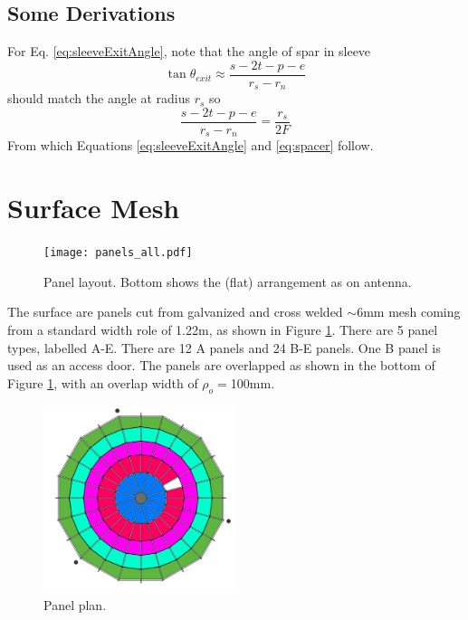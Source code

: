 \documentclass{article}
\begin{document}
\subsection{Some Derivations}
\label{sec:derive}
For Eq. \ref{eq:sleeveExitAngle}, note that the angle of spar in sleeve
\begin{equation}
\tan\theta_{exit} \approx \frac{s - 2t - p - e}{r_s-r_n}
\end{equation}
should match the angle at radius $r_s$ so 
\begin{equation}
\frac{s-2t-p-e}{r_s-r_n} = \frac{r_s}{2F}
\end{equation}
From which Equations \ref {eq:sleeveExitAngle} and \ref{eq:spacer} follow.

\section{Surface Mesh}
\vspace{-.5in}
\noindent
\begin{figure}[H]
\texttt{[image: panels\_all.pdf]}
\centering
\vspace{-.15in}
\caption{Panel layout.  Bottom shows the (flat) arrangement as on antenna.}
\label{fig:panels}
\end{figure}
The surface are panels cut from galvanized and cross welded $\sim$6mm mesh coming from a standard width role of 1.22m, as shown in Figure \ref{fig:panels}.  There are 5 panel types, labelled A-E.  There are 12 A panels and 24 B-E panels.  One B panel is used as an access door.  The panels are overlapped as shown in the bottom of Figure \ref{fig:panels}, with an overlap width of $\rho_o = $100mm.
\begin{figure}[H]
\includegraphics[width=0.5\textwidth]{antPlan.png}
\centering
\vspace{-.15in}
\caption{Panel plan.}
\label{fig:antplan}
\end{figure}
\end{document}
